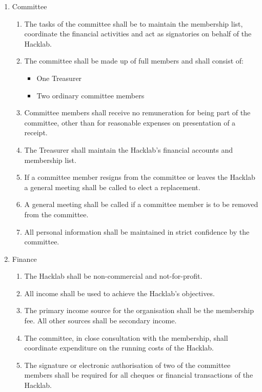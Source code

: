 \documentclass{article}
\begin{document}
\begin{enumerate}
\begin{enumerate}
    \end{enumerate} %
  \item Committee
    \begin{enumerate}
    \item The tasks of the committee shall be to maintain the
      membership list, coordinate the financial activities and act as
      signatories on behalf of the Hacklab.
    \item The committee shall be made up of full members and shall consist of:
      \begin{itemize}
      \item One Treasurer
      \item Two ordinary committee members
      \end{itemize}
    \item Committee members shall receive no remuneration for being
      part of the committee, other than for reasonable expenses on
      presentation of a receipt.
    \item The Treasurer shall maintain the Hacklab's financial
      accounts and membership list.
    \item If a committee member resigns from the committee or leaves
      the Hacklab a general meeting shall be called to elect a
      replacement.
    \item A general meeting shall be called if a committee member is
      to be removed from the committee.
    \item All personal information shall be maintained in strict
      confidence by the committee.
    \end{enumerate} %
  \item Finance
    \begin{enumerate}
    \item The Hacklab shall be non-commercial and not-for-profit.
    \item All income shall be used to achieve the Hacklab's objectives.
    \item The primary income source for the organisation shall be
      the membership fee. All other sources shall be secondary income.
    \item The committee, in close consultation with the membership, shall
      coordinate expenditure on the running costs of the Hacklab.
    \item The signature or electronic authorisation of two of the
      committee members shall be required for all cheques or
      financial transactions of the Hacklab.

\end{enumerate}
\end{enumerate}
\end{document}
